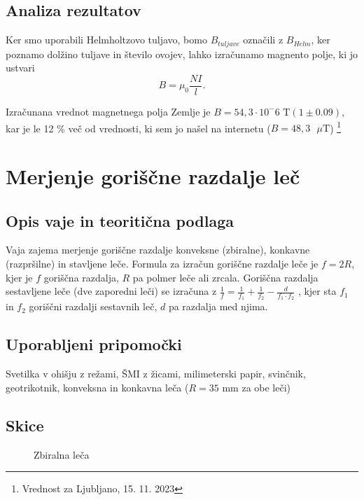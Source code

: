 \documentclass[12pt]{article}
\begin{document}
	\subsection*{Analiza rezultatov}
	Ker smo uporabili Helmholtzovo tuljavo, bomo $B_{tuljave}$ označili z $B_{Helm}$, ker 
	poznamo dolžino tuljave in število ovojev, lahko izračunamo magnento polje, ki jo ustvari
	\begin{equation}
		B = \mu_0 \frac{NI}{l}.
	\end{equation}

	Izračunana vrednot magnetnega polja Zemlje je $B = 54,3 \cdot 10^-6 \text{ T} (1 \pm 0.09)$,
	kar je le 12 \% več od vrednosti, ki sem jo našel na internetu \cite{noaa} ($B = 48,3 \text{ } \mu \text{T} $)
	\footnote{Vrednost za Ljubljano, 15. 11. 2023}

\newpage
\section{Merjenje goriščne razdalje leč}
	\subsection*{Opis vaje in teoritična podlaga}
	Vaja zajema merjenje goriščne razdalje konveksne (zbiralne), konkavne (razpršilne) in 
	stavljene leče. Formula za izračun goriščne razdalje leče je $f = 2R$, kjer je $f$ 
	goriščna razdalja, $R$ pa polmer leče ali zrcala. Goriščna razdalja sestavljene leče
	(dve zaporedni leči) se izračuna z $\frac{1}{f} = \frac{1}{f_1} + \frac{1}{f_2} - \frac{d}{f_1 \cdot f_2}$
	\cite{lece}, kjer sta $f_1$ in $f_2$ goriščni razdalji sestavnih leč, $d$ pa razdalja med njima.

	\subsection*{Uporabljeni pripomočki}
	Svetilka v ohišju z režami, ŠMI z žicami, milimeterski papir, svinčnik, geotrikotnik, 
	konveksna in konkavna leča ($R = 35 \text{ mm}$ za obe leči)
	\subsection*{Skice}
	
	\begin{figure}[h!]
		\centering
		\caption{Zbiralna leča}
	\end{figure}
	
\end{document}
